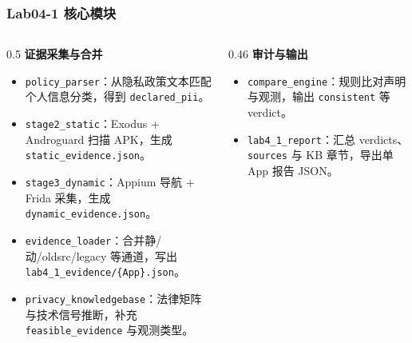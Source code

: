\documentclass[AutoFakeBold,AutoFakeSlant]{beamer}
\begin{document}
\begin{frame}
    \frametitle{Lab04-1 核心模块}
    \scriptsize
    \begin{columns}[T]
        \begin{column}{0.5\textwidth}
            \textbf{证据采集与合并}
            \begin{itemize}
                \item \texttt{policy\_parser}：从隐私政策文本匹配个人信息分类，得到 \texttt{declared\_pii}。
                \item \texttt{stage2\_static}：Exodus + Androguard 扫描 APK，生成 \texttt{static\_evidence.json}。
                \item \texttt{stage3\_dynamic}：Appium 导航 + Frida 采集，生成 \texttt{dynamic\_evidence.json}。
                \item \texttt{evidence\_loader}：合并静/动/oldsrc/legacy 等通道，写出 \texttt{lab4\_1\_evidence/\{App\}.json}。
                \item \texttt{privacy\_knowledgebase}：法律矩阵与技术信号推断，补充 \texttt{feasible\_evidence} 与观测类型。
            \end{itemize}
        \end{column}
        \begin{column}{0.46\textwidth}
            \textbf{审计与输出}
            \begin{itemize}
                \item \texttt{compare\_engine}：规则比对声明与观测，输出 \texttt{consistent} 等 verdict。
                \item \texttt{lab4\_1\_report}：汇总 verdicts、\texttt{sources} 与 KB 章节，导出单 App 报告 JSON。
            \end{itemize}
        \end{column}
    \end{columns}
\end{frame}
\end{document}
